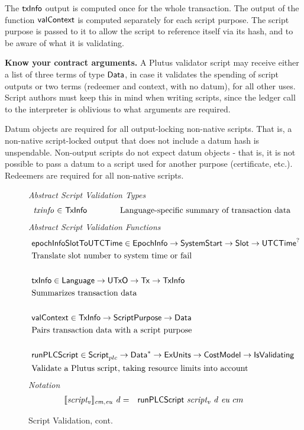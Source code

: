   The $\mathsf{txInfo}$ output is computed once for the whole transaction. The output of the function
  $\mathsf{valContext}$ is computed separately for each script purpose.
  The script purpose is passed to it
  to allow the script to reference itself via its hash, and to be aware of what it is validating.

\textbf{Know your contract arguments.}
  A Plutus validator script may receive either a list of three terms of type $\mathsf{Data}$, in case it validates the spending of script outputs
  or two terms (redeemer and context, with no datum), for all other uses.
  Script authors must keep this in mind when writing scripts, since the ledger call to the interpreter is oblivious to what
  arguments are required.

  Datum objects are required for all output-locking non-native scripts. That is, a
  non-native script-locked output that does not include a datum hash is unspendable.
  Non-output scripts do not expect datum objects - that is, it is not possible to pass
  a datum to a script used for another purpose (certificate, etc.). Redeemers
  are required for all non-native scripts.

\begin{figure*}[htb]
  \emph{Abstract Script Validation Types}
  \begin{equation*}
    \begin{array}{r@{~\in~}l@{\quad\quad\quad\quad}r}
      \var{txinfo} &\TxInfo & \text{Language-specific summary of transaction data}\\
    \end{array}
  \end{equation*}
  \emph{Abstract Script Validation Functions}
  \begin{align*}
     &\mathsf{epochInfoSlotToUTCTime} \in \mathsf{EpochInfo} \to \mathsf{SystemStart} \to \mathsf{Slot} \to \mathsf{UTCTime}^? \\
     &\text{Translate slot number to system time or fail} \\~\\
     &\mathsf{txInfo} \in \mathsf{Language} \to \mathsf{UTxO} \to \mathsf{Tx} \to \mathsf{TxInfo} \\
     &\text{Summarizes transaction data} \\~\\
     &\mathsf{valContext} \in \mathsf{TxInfo} \to \mathsf{ScriptPurpose} \to \mathsf{Data} \\
     &\text{Pairs transaction data with a script purpose} \\~\\
     &\mathsf{runPLCScript} \in \mathsf{Script}_{plc} \to \mathsf{Data}^{*} \to \mathsf{ExUnits} \to \mathsf{CostModel} \to
     \mathsf{IsValidating} \\
     &\text{Validate a Plutus script, taking resource limits into account}
  \end{align*}
  \emph{Notation}
  \begin{align*}
    \llbracket \mathit{script_v} \rrbracket_{\mathit{cm},\mathit{eu}}~\mathit{d}
    &=& \mathsf{runPLCScript} ~\mathit{script_v}~\mathit{d}~\mathit{eu}~{cm}
  \end{align*}
  \caption{Script Validation, cont.}
  \label{fig:defs:functions-valid}
\end{figure*}

